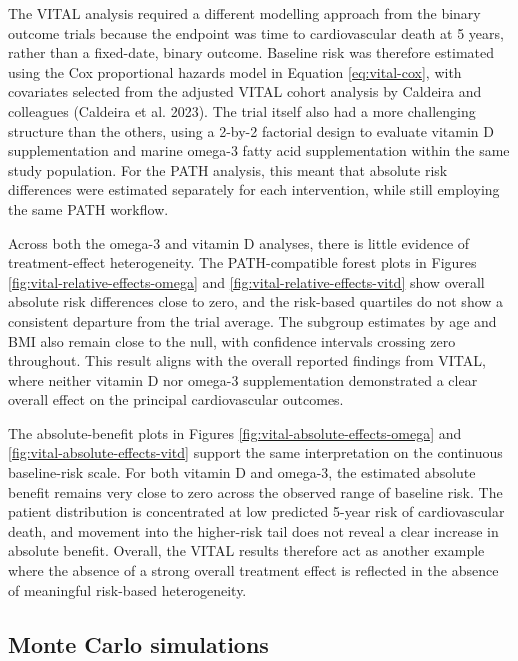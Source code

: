 \documentclass{article}
\begin{document}
The VITAL analysis required a different modelling approach from the
binary outcome trials because the endpoint was time to cardiovascular
death at 5 years, rather than a fixed-date, binary outcome. Baseline
risk was therefore estimated using the Cox proportional hazards model in
Equation \ref{eq:vital-cox}, with covariates selected from the adjusted
VITAL cohort analysis by Caldeira and colleagues (Caldeira et al. 2023).
The trial itself also had a more challenging structure than the others,
using a 2-by-2 factorial design to evaluate vitamin D supplementation
and marine omega-3 fatty acid supplementation within the same study
population. For the PATH analysis, this meant that absolute risk
differences were estimated separately for each intervention, while still
employing the same PATH workflow.

Across both the omega-3 and vitamin D analyses, there is little evidence
of treatment-effect heterogeneity. The PATH-compatible forest plots in
Figures \ref{fig:vital-relative-effects-omega} and
\ref{fig:vital-relative-effects-vitd} show overall absolute risk
differences close to zero, and the risk-based quartiles do not show a
consistent departure from the trial average. The subgroup estimates by
age and BMI also remain close to the null, with confidence intervals
crossing zero throughout. This result aligns with the overall reported
findings from VITAL, where neither vitamin D nor omega-3 supplementation
demonstrated a clear overall effect on the principal cardiovascular
outcomes.

The absolute-benefit plots in Figures
\ref{fig:vital-absolute-effects-omega} and
\ref{fig:vital-absolute-effects-vitd} support the same interpretation on
the continuous baseline-risk scale. For both vitamin D and omega-3, the
estimated absolute benefit remains very close to zero across the
observed range of baseline risk. The patient distribution is
concentrated at low predicted 5-year risk of cardiovascular death, and
movement into the higher-risk tail does not reveal a clear increase in
absolute benefit. Overall, the VITAL results therefore act as another
example where the absence of a strong overall treatment effect is
reflected in the absence of meaningful risk-based heterogeneity.

\FloatBarrier

\subsection{Monte Carlo simulations}\label{monte-carlo-simulations}
\end{document}
